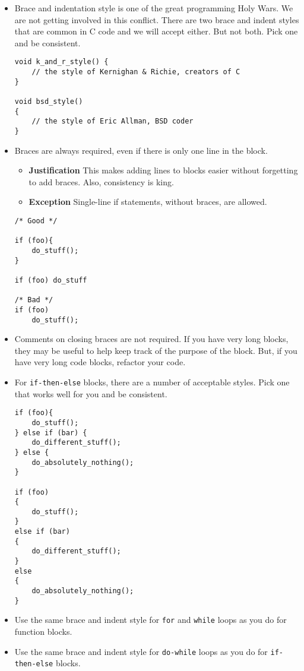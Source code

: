 \begin{itemize}

    \item Brace and indentation style is one of the great programming Holy Wars.  We are not getting involved in this conflict.  There are two brace and indent styles that are common in C code and we will accept either.  But not both.  Pick one and be consistent.
        \begin{verbatim}
void k_and_r_style() {
    // the style of Kernighan & Richie, creators of C
}

void bsd_style()
{
    // the style of Eric Allman, BSD coder
}
        \end{verbatim}

    \item Braces are always required, even if there is only one line in the block.  
        \begin{itemize}
            \item \textbf{Justification} This makes adding lines to blocks easier without forgetting to add braces.  Also, consistency is king.
            \item \textbf{Exception} Single-line if statements, without braces, are allowed.
        \end{itemize}
        \begin{verbatim}
/* Good */

if (foo){
    do_stuff();
}

if (foo) do_stuff

/* Bad */
if (foo)
    do_stuff();
        \end{verbatim}

    \item Comments on closing braces are not required.  If you have very long blocks, they may be useful to help keep track of the purpose of the block.  But, if you have very long code blocks, refactor your code.
    \item For \texttt{if-then-else} blocks, there are a number of acceptable styles.  Pick one that works well for you and be consistent.
        \begin{verbatim}
if (foo){
    do_stuff();
} else if (bar) {
    do_different_stuff();
} else {
    do_absolutely_nothing();
}

if (foo)
{
    do_stuff();
} 
else if (bar) 
{
    do_different_stuff();
}
else 
{
    do_absolutely_nothing();
}
        \end{verbatim}

    \item Use the same brace and indent style for \texttt{for} and \texttt{while} loops as you do for function blocks.
    \item Use the same brace and indent style for \texttt{do-while} loops as you do for \texttt{if-then-else} blocks.

\end{itemize}


